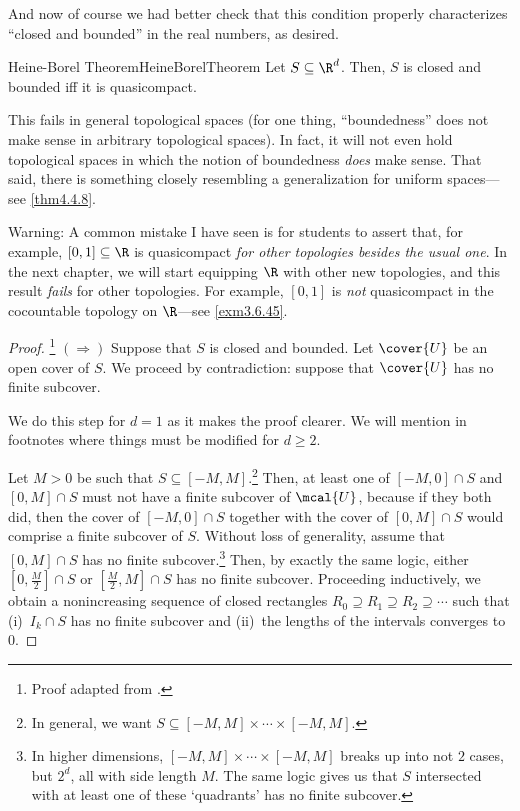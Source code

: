 And now of course we had better check that this condition properly characterizes ``closed and bounded'' in the real numbers, as desired.
\begin{thm}{Heine-Borel Theorem}{HeineBorelTheorem}
Let $S\subseteq \R ^d$.  Then, $S$ is closed and bounded iff it is quasicompact.
\begin{rmk}
This fails in general topological spaces (for one thing, ``boundedness'' does not make sense in arbitrary topological spaces).  In fact, it will not even hold topological spaces in which the notion of boundedness \emph{does} make sense.  That said, there is something closely resembling a generalization for uniform spaces---see \cref{thm4.4.8}.
\end{rmk}
\begin{wrn}
Warning:  A common mistake I have seen is for students to assert that, for example, $[0,1]\subseteq \R$ is quasicompact \emph{for other topologies besides the usual one}.  In the next chapter, we will start equipping $\R$ with other new topologies, and this result \emph{fails} for other topologies.  For example, $[0,1]$ is \emph{not} quasicompact in the cocountable topology on $\R$---see \cref{exm3.6.45}.
\end{wrn}
\begin{proof}\footnote{Proof adapted from \cite[pg.~87--89]{Abbott}.}
$(\Rightarrow )$
Suppose that $S$ is closed and bounded.  Let $\cover{U}$ be an open cover of $S$.  We proceed by contradiction:  suppose that $\cover{U}$ has no finite subcover.

We do this step for $d=1$ as it makes the proof clearer.  We will mention in footnotes where things must be modified for $d\geq 2$.

Let $M>0$ be such that $S\subseteq [-M,M]$.\footnote{In general, we want $S\subseteq [-M,M]\times \cdots \times [-M,M]$.}  Then, at least one of $[-M,0]\cap S$ and $[0,M]\cap S$ must not have a finite subcover of $\mcal{U}$, because if they both did, then the cover of $[-M,0]\cap S$ together with the cover of $[0,M]\cap S$ would comprise a finite subcover of $S$.  Without loss of generality, assume that $[0,M]\cap S$ has no finite subcover.\footnote{In higher dimensions, $[-M,M]\times \cdots \times [-M,M]$ breaks up into not $2$ cases, but $2^d$, all with side length $M$.  The same logic gives us that $S$ intersected with at least one of these `quadrants' has no finite subcover.}  Then, by exactly the same logic, either $\left[ 0,\frac{M}{2}\right] \cap S$ or $\left[ \frac{M}{2},M\right] \cap S$ has no finite subcover.  Proceeding inductively, we obtain a nonincreasing sequence of closed rectangles $R_0\supseteq R_1\supseteq R_2\supseteq \cdots$ such that (i)~$I_k\cap S$ has no finite subcover and (ii)~the lengths of the intervals converges to $0$.


\end{proof}
\end{thm}

